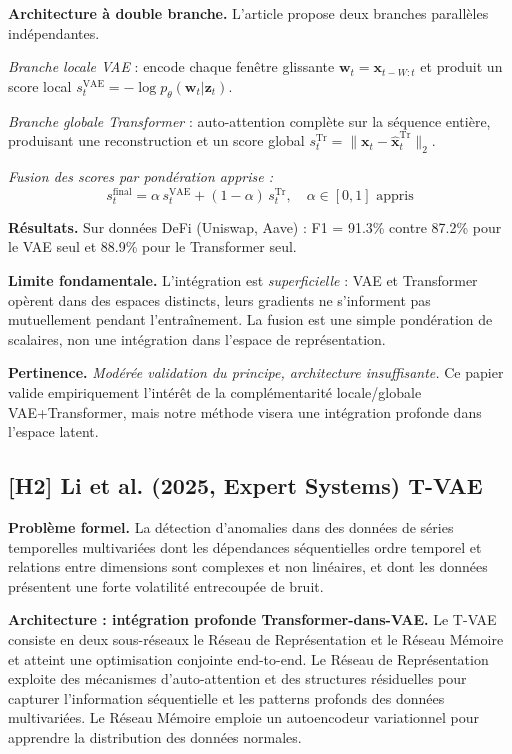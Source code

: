 \documentclass[12pt,a4paper]{article}
\begin{document}
\textbf{Architecture à double branche.} L'article propose deux branches parallèles indépendantes.

\textit{Branche locale  VAE} : encode chaque fenêtre glissante $\mathbf{w}_t = \mathbf{x}_{t-W:t}$ et produit un score local $s^{\mathrm{VAE}}_t = -\log p_\theta(\mathbf{w}_t|\mathbf{z}_t)$.

\textit{Branche globale  Transformer} : auto-attention complète sur la séquence entière, produisant une reconstruction et un score global $s^{\mathrm{Tr}}_t = \|\mathbf{x}_t - \hat{\mathbf{x}}^{\mathrm{Tr}}_t\|_2$.

\textit{Fusion des scores par pondération apprise :}
$$s_t^{\mathrm{final}} = \alpha\,s^{\mathrm{VAE}}_t + (1-\alpha)\,s^{\mathrm{Tr}}_t, \quad \alpha \in [0,1]\text{ appris}$$

\textbf{Résultats.} Sur données DeFi (Uniswap, Aave) : F1 = 91.3\% contre 87.2\% pour le VAE seul et 88.9\% pour le Transformer seul.

\textbf{Limite fondamentale.} L'intégration est \textit{superficielle} : VAE et Transformer opèrent dans des espaces distincts, leurs gradients ne s'informent pas mutuellement pendant l'entraînement. La fusion est une simple pondération de scalaires, non une intégration dans l'espace de représentation.

\textbf{Pertinence.} \textit{Modérée  validation du principe, architecture insuffisante.} Ce papier valide empiriquement l'intérêt de la complémentarité locale/globale VAE+Transformer, mais notre méthode visera une intégration profonde dans l'espace latent.

\subsection{[H2] Li et al. (2025, Expert Systems)  T-VAE}

\textbf{Problème formel.} La détection d'anomalies dans des données de séries temporelles multivariées dont les dépendances séquentielles  ordre temporel et relations entre dimensions  sont complexes et non linéaires, et dont les données présentent une forte volatilité entrecoupée de bruit.

\textbf{Architecture : intégration profonde Transformer-dans-VAE.} Le T-VAE consiste en deux sous-réseaux  le Réseau de Représentation et le Réseau Mémoire  et atteint une optimisation conjointe end-to-end. Le Réseau de Représentation exploite des mécanismes d'auto-attention et des structures résiduelles pour capturer l'information séquentielle et les patterns profonds des données multivariées. Le Réseau Mémoire emploie un autoencodeur variationnel pour apprendre la distribution des données normales.
\end{document}
